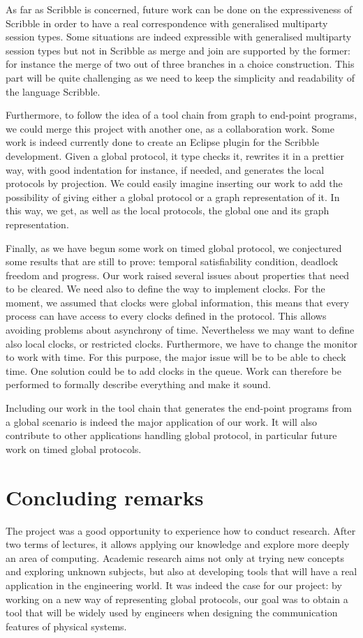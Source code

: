 \documentclass[a4paper,11pt,twoside]{report}
\begin{document}
As far as Scribble is concerned, future work can be done on the expressiveness of Scribble in order to have a real correspondence with generalised multiparty session types. Some situations are indeed expressible with generalised multiparty session types but not in Scribble as merge and join are supported by the former: for instance the merge of two out of three branches in a choice construction. This part will be quite challenging as we need to keep the simplicity and readability of the language Scribble.

Furthermore, to follow the idea of a tool chain from graph to end-point programs, we could merge this project with another one, as a collaboration work. Some work is indeed currently done to create an Eclipse plugin for the Scribble development. Given a global protocol, it type checks it, rewrites it in a prettier way, with good indentation for instance, if needed, and generates the local protocols by projection. We could easily imagine inserting our work to add the possibility of giving either a global protocol or a graph representation of it. In this way, we get, as well as the local protocols, the global one and its graph representation.

Finally, as we have begun some work on timed global protocol, we conjectured some results that are still to prove: temporal satisfiability condition, deadlock freedom and progress. Our work raised several issues about properties that need to be cleared. We need also to define the way to implement clocks. For the moment, we assumed that clocks were global information, this means that every process can have access to every clocks defined in the protocol. This allows avoiding problems about asynchrony of time. Nevertheless we may want to define also local clocks, or restricted clocks. Furthermore, we have to change the monitor to work with time. For this purpose, the major issue will be to be able to check time. One solution could be to add clocks in the queue. Work can therefore be performed to formally describe everything and make it sound.

Including our work in the tool chain that generates the end-point programs from a global scenario is indeed the major application of our work. It will also contribute to other applications handling global protocol, in particular future work on timed global protocols.


\section*{Concluding remarks}
The project was a good opportunity to experience how to conduct research. After two terms of lectures, it allows applying our knowledge and explore more deeply an area of computing. Academic research aims not only at trying new concepts and exploring unknown subjects, but also at developing tools that will have a real application in the engineering world. It was indeed the case for our project: by working on a new way of representing global protocols, our goal was to obtain a tool that will be widely used by engineers when designing the communication features of physical systems.
\end{document}
